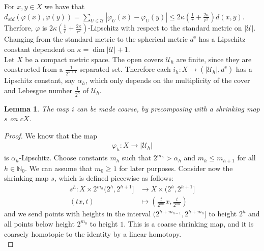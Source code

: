 \documentclass[a4paper,11pt]{article}
\theoremstyle{definition}
\theoremstyle{plain}
\newtheorem{lemma}[definition]{Lemma}
\theoremstyle{remark}
\begin{document}
{For $x,y\in X$ we have that $d_{std}(\varphi(x),\varphi(y)) = \sum_{U\in \mathcal{U}} |\varphi_{U}(x)-\varphi_{U}(y)| \leq 2\kappa (\frac{1}{r} + \frac{2\kappa}{r^2}) d(x,y)$. Therfore, $\varphi$ is $2\kappa (\frac{1}{r} + \frac{2\kappa}{r^2})$-Lipschitz with respect to the standard metric on $|\mathcal{U}|$. Changing from the standard metric to the spherical metric $d^s$ has a Lipschitz constant dependent on $\kappa = \dim |\mathcal{U}|+1$.\\

Let $X$ be a compact metric space. The open covers $\mathcal{U}_{h}$ are finite, since they are constructed from a $\frac{1}{2^{h+1}}$-separated set. Therefore each $i_{h}: X\rightarrow (|\mathcal{U}_{h}|,d^s)$ has a Lipschitz constant, say $\alpha_{h}$, which only depends on the multiplicity of the cover and Lebesgue number $\frac{1}{2^h}$ of  $\mathcal{U}_{h}$. \\

\begin{lemma} The map $i$ can be made coarse, by precomposing with a shrinking map $s$ on $cX$. \label{shrinkcoarse}
\end{lemma}

\begin{proof} We know that the map 
\begin{align*}
\varphi_{h}: X\rightarrow |\mathcal{U}_{h}|
\end{align*}
is $\alpha_{h}$-Lipschitz. Choose constants $m_h$ such that $2^{m_h} > \alpha_{h}$ and $m_h \leq m_{h+1}$ for all $h\in \mathbb{N}_{0}$.  We can assume that $m_{0}\geq 1$ for later purposes. Consider now the shrinking map $s$, which is defined piecewise as follows:
\begin{align*}
s^{h}: X\times 2^{m_{h}} (2^h,2^{h+1}]&\rightarrow X \times (2^{h},2^{h+1}]\\
(tx,t)&\mapsto (\frac{t}{2^{m_{h}}}x, \frac{t}{2^{m_{h}}})
\end{align*}
and we send points with heights in the interval $(2^{h+m_{h-1}}, 2^{h+m_{h}}]$ to height $2^{h}$ and all points below height $2^{m_0}$ to height $1$. This is a coarse shrinking map, and it is coarsely homotopic to the identity by a linear homotopy. \\


\end{proof}}
\end{document}
